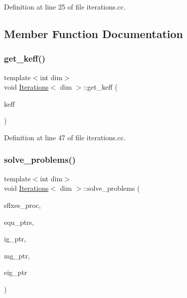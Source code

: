 Definition at line 25 of file iterations.\+cc.



\subsection{Member Function Documentation}
\mbox{\label{class_iterations_ae80aa8efae880a81421502dfdf1a7466}} 
\subsubsection{\texorpdfstring{get\+\_\+keff()}{get\_keff()}}
{\footnotesize\ttfamily template$<$int dim$>$ \\
void \hyperlink{class_iterations}{Iterations}$<$ dim $>$\+::get\+\_\+keff (\begin{DoxyParamCaption}\item[{double \&}]{keff }\end{DoxyParamCaption})}



Definition at line 47 of file iterations.\+cc.

\mbox{\label{class_iterations_ae41347e35b05b6f0fd3cb2a03ab60341}} 
\subsubsection{\texorpdfstring{solve\+\_\+problems()}{solve\_problems()}}
{\footnotesize\ttfamily template$<$int dim$>$ \\
void \hyperlink{class_iterations}{Iterations}$<$ dim $>$\+::solve\+\_\+problems (\begin{DoxyParamCaption}\item[{std\+::vector$<$ Vector$<$ double $>$ $>$ \&}]{sflxes\+\_\+proc,  }\item[{std\+::vector$<$ std\+\_\+cxx11\+::shared\+\_\+ptr$<$ \hyperlink{class_equation_base}{Equation\+Base}$<$ dim $>$ $>$ $>$ \&}]{equ\+\_\+ptrs,  }\item[{std\+\_\+cxx11\+::shared\+\_\+ptr$<$ \hyperlink{class_i_g_base}{I\+G\+Base}$<$ dim $>$ $>$}]{ig\+\_\+ptr,  }\item[{std\+\_\+cxx11\+::shared\+\_\+ptr$<$ \hyperlink{class_m_g_base}{M\+G\+Base}$<$ dim $>$ $>$}]{mg\+\_\+ptr,  }\item[{std\+\_\+cxx11\+::shared\+\_\+ptr$<$ \hyperlink{class_eigen_base}{Eigen\+Base}$<$ dim $>$ $>$}]{eig\+\_\+ptr }\end{DoxyParamCaption})}



